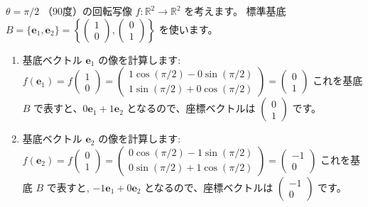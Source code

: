 \begin{ex}[2次元平面上の回転写像の表現行列]
$\theta = \pi/2$ （90度）の回転写像 $f: \mathbb{R}^2 \to \mathbb{R}^2$ を考えます。
標準基底 $B = \{\bm{e}_1, \bm{e}_2\} = \left\{ \begin{pmatrix} 1 \\ 0 \end{pmatrix}, \begin{pmatrix} 0 \\ 1 \end{pmatrix} \right\}$ を使います。
\begin{enumerate}
\item 基底ベクトル $\bm{e}_1$ の像を計算します:
    $f(\bm{e}_1) = f\begin{pmatrix} 1 \\ 0 \end{pmatrix} = \begin{pmatrix} 1\cos(\pi/2) - 0\sin(\pi/2) \\ 1\sin(\pi/2) + 0\cos(\pi/2) \end{pmatrix} = \begin{pmatrix} 0 \\ 1 \end{pmatrix}$
    これを基底 $B$ で表すと、$0\bm{e}_1 + 1\bm{e}_2$ となるので、座標ベクトルは $\begin{pmatrix} 0 \\ 1 \end{pmatrix}$ です。
\item 基底ベクトル $\bm{e}_2$ の像を計算します:
    $f(\bm{e}_2) = f\begin{pmatrix} 0 \\ 1 \end{pmatrix} = \begin{pmatrix} 0\cos(\pi/2) - 1\sin(\pi/2) \\ 0\sin(\pi/2) + 1\cos(\pi/2) \end{pmatrix} = \begin{pmatrix} -1 \\ 0 \end{pmatrix}$
    これを基底 $B$ で表すと, $-1\bm{e}_1 + 0\bm{e}_2$ となるので、座標ベクトルは $\begin{pmatrix} -1 \\ 0 \end{pmatrix}$ です。
\end{enumerate}


\end{ex}

